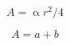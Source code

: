 \documentclass{book}
\begin{document}

\lipsum[1]

\[ A = \upalpha r^2/4\]

$$ A = a + b $$
\end{document}
